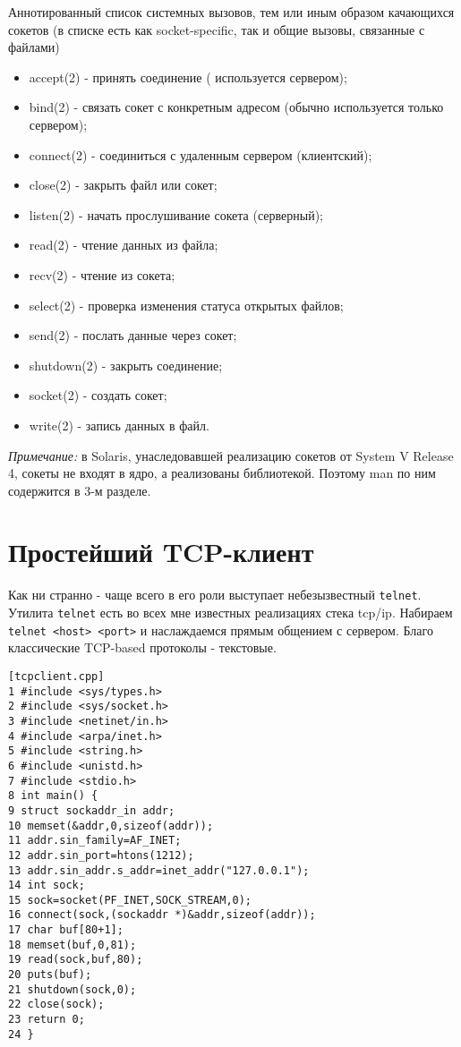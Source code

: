 Аннотированный список системных вызовов, тем или иным образом качающихся сокетов (в списке есть как socket-specific, так и общие вызовы, связанные с файлами)
\begin{itemize}
\item accept(2) - принять соединение ( используется сервером);
\item bind(2) - связать сокет с конкретным адресом (обычно используется только сервером);
\item connect(2) - соединиться с удаленным сервером (клиентский);
\item close(2) - закрыть файл или сокет;
\item listen(2) - начать прослушивание сокета (серверный);
\item read(2) - чтение данных из файла;
\item recv(2) - чтение из сокета;
\item select(2) - проверка изменения статуса открытых файлов;
\item send(2) - послать данные через сокет;
\item shutdown(2) - закрыть соединение;
\item socket(2) - создать сокет;
\item write(2) - запись данных в файл.
\end{itemize}

\emph{Примечание:} в Solaris, унаследовавшей реализацию сокетов от System V Release 4, сокеты не входят в ядро, а реализованы библиотекой. Поэтому man по ним содержится в 3-м разделе.

\section{Простейший TCP-клиент}

Как ни странно - чаще всего в его роли выступает небезызвестный \verb+telnet+. Утилита \verb+telnet+ есть во всех мне известных реализациях стека tcp/ip. Набираем \verb+telnet <host> <port>+ и наслаждаемся прямым общением с сервером. Благо классические TCP-based протоколы - текстовые.
\begin{verbatim}
[tcpclient.cpp]
1 #include <sys/types.h>
2 #include <sys/socket.h>
3 #include <netinet/in.h>
4 #include <arpa/inet.h>
5 #include <string.h>
6 #include <unistd.h>
7 #include <stdio.h>
8 int main() {
9 struct sockaddr_in addr;
10 memset(&addr,0,sizeof(addr));
11 addr.sin_family=AF_INET;
12 addr.sin_port=htons(1212);
13 addr.sin_addr.s_addr=inet_addr("127.0.0.1");
14 int sock;
15 sock=socket(PF_INET,SOCK_STREAM,0);
16 connect(sock,(sockaddr *)&addr,sizeof(addr));
17 char buf[80+1];
18 memset(buf,0,81);
19 read(sock,buf,80);
20 puts(buf);
21 shutdown(sock,0);
22 close(sock);
23 return 0;
24 }
\end{verbatim}

